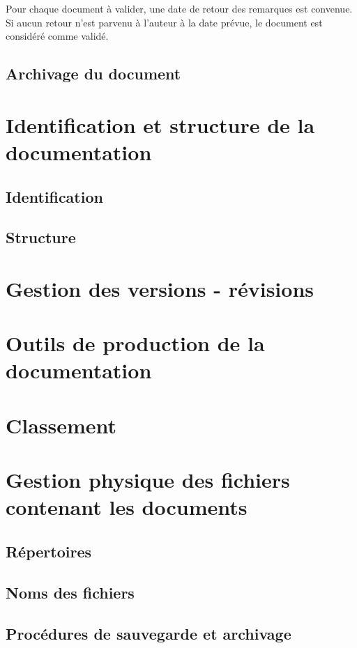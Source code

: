 \begin{itemize}
Pour chaque document à valider, une date de retour des remarques est convenue. Si aucun retour n'est parvenu à l'auteur à la date prévue, le document est considéré comme validé.

\subsection{Archivage du document}

\section{Identification et structure de la documentation}

\subsection{Identification}
\subsection{Structure}

\section{Gestion des versions - révisions}

\section{Outils de production de la documentation}

\section{Classement}

\section{Gestion physique des fichiers contenant les documents}
\subsection{Répertoires}
\subsection{Noms des fichiers}
\subsection{Procédures de sauvegarde et archivage}


\end{itemize}
